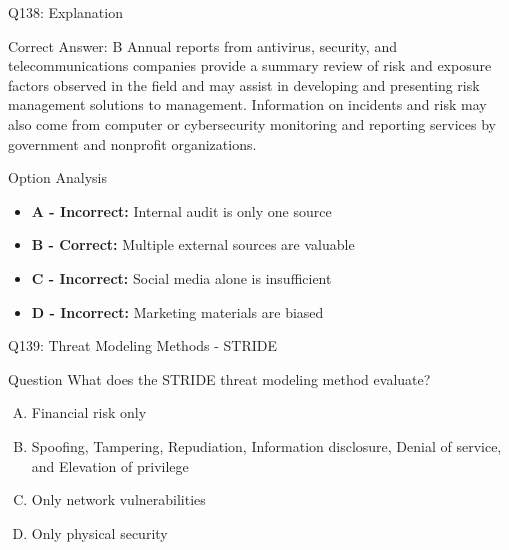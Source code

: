 \documentclass{beamer}
\begin{document}
	\begin{frame}{Q138: Explanation}
		\begin{block}{Correct Answer: B}
			Annual reports from antivirus, security, and telecommunications companies provide a summary review of risk and exposure factors observed in the field and may assist in developing and presenting risk management solutions to management. Information on incidents and risk may also come from computer or cybersecurity monitoring and reporting services by government and nonprofit organizations.
		\end{block}
		\begin{block}{Option Analysis}
			\begin{itemize}
				\item \textbf{A - Incorrect:} Internal audit is only one source
				\item \textbf{B - Correct:} Multiple external sources are valuable
				\item \textbf{C - Incorrect:} Social media alone is insufficient
				\item \textbf{D - Incorrect:} Marketing materials are biased
			\end{itemize}
		\end{block}
	\end{frame}
	
	\begin{frame}{Q139: Threat Modeling Methods - STRIDE}
		\begin{block}{Question}
			What does the STRIDE threat modeling method evaluate?
		\end{block}
		\begin{enumerate}[(A)]
			\item Financial risk only
			\item Spoofing, Tampering, Repudiation, Information disclosure, Denial of service, and Elevation of privilege
			\item Only network vulnerabilities
			\item Only physical security
		\end{enumerate}
	\end{frame}
	
\end{document}
